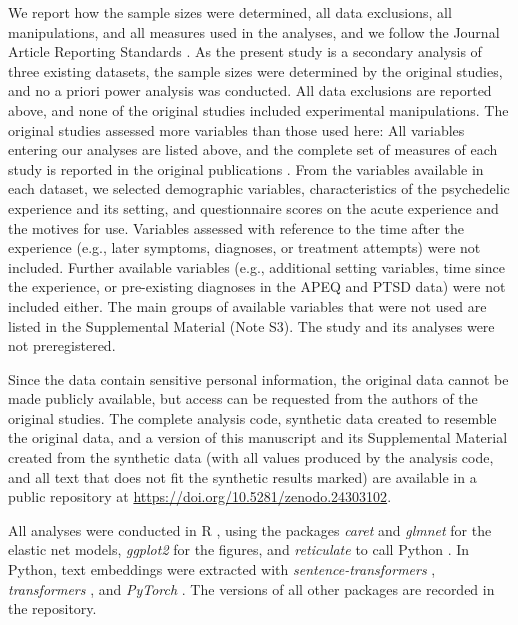 \documentclass[man,floatsintext]{apa7}
\begin{document}
We report how the sample sizes were determined, all data exclusions, all manipulations, and all measures used in the analyses, and we follow the Journal Article Reporting Standards \parencite{appelbaum2018journal}. As the present study is a secondary analysis of three existing datasets, the sample sizes were determined by the original studies, and no a priori power analysis was conducted. All data exclusions are reported above, and none of the original studies included experimental manipulations. The original studies assessed more variables than those used here: All variables entering our analyses are listed above, and the complete set of measures of each study is reported in the original publications \parencite{wolff2022acceptance,wolff2024measuring,evens2026post}. From the variables available in each dataset, we selected demographic variables, characteristics of the psychedelic experience and its setting, and questionnaire scores on the acute experience and the motives for use. Variables assessed with reference to the time after the experience (e.g., later symptoms, diagnoses, or treatment attempts) were not included. Further available variables (e.g., additional setting variables, time since the experience, or pre-existing diagnoses in the APEQ and PTSD data) were not included either. The main groups of available variables that were not used are listed in the Supplemental Material (Note S3). The study and its analyses were not preregistered.

Since the data contain sensitive personal information, the original data cannot be made publicly available, but access can be requested from the authors of the original studies. The complete analysis code, synthetic data created to resemble the original data, and a version of this manuscript and its Supplemental Material created from the synthetic data (with all values produced by the analysis code, and all text that does not fit the synthetic results marked) are available in a public repository at \url{https://doi.org/10.5281/zenodo.24303102}.

All analyses were conducted in R \parencite[Version 4.6.1;][]{rcore2026}, using the packages \emph{caret} \parencite[Version 7.0-1;][]{caret} and \emph{glmnet} \parencite[Version 5.0;][]{friedman2010regularization} for the elastic net models, \emph{ggplot2} \parencite[Version 4.0.3;][]{wickham2016ggplot2} for the figures, and \emph{reticulate} \parencite[Version 1.46.0;][]{reticulate} to call Python \parencite[Version 3.12.12;][]{python312}. In Python, text embeddings were extracted with \emph{sentence-transformers} \parencite[Version 6.0.1;][]{reimers2019sentence}, \emph{transformers} \parencite[Version 5.14.1;][]{wolf2020transformers}, and \emph{PyTorch} \parencite[Version 2.14.0;][]{paszke2019pytorch}. The versions of all other packages are recorded in the repository.
\end{document}
